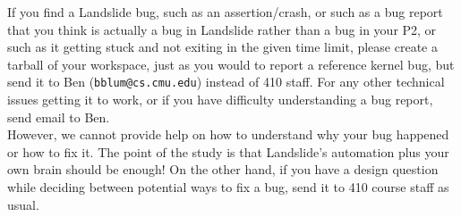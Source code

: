 \documentclass{article}
\begin{document}
 If you find a Landslide bug, such as an assertion/crash, or such as a
bug report that you think is actually a bug in Landslide rather than a bug in your P2, or such as it getting stuck
and not exiting in the given time limit, please create a tarball of your workspace, just as you would to report
a reference kernel bug, but send it to Ben ({\tt bblum@cs.cmu.edu}) instead of 410 staff. For any other technical
issues getting it to work, or if you have difficulty understanding a bug report, send email to Ben.
\\

\noindent However, we cannot provide help on how to understand why your bug happened or how to fix it. The point of
the study is that Landslide's automation plus your own brain should be enough! On the other hand, if you have
a design question while deciding between potential ways to fix a bug, send it to 410 course staff as usual.
\end{document}
